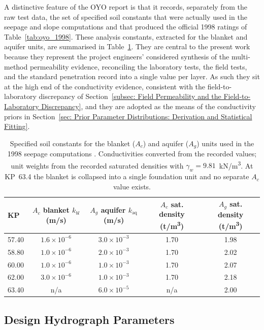 A distinctive feature of the OYO report is that it records, separately from the raw test data, the set of specified soil constants that were actually used in the seepage and slope computations and that produced the official 1998 ratings of Table~\ref{tab:oyo_1998}. These analysis constants, extracted for the blanket and aquifer units, are summarised in Table~\ref{tab:form5}. They are central to the present work because they represent the project engineers' considered synthesis of the multi-method permeability evidence, reconciling the laboratory tests, the field tests, and the standard penetration record into a single value per layer. As such they sit at the high end of the conductivity evidence, consistent with the field-to-laboratory discrepancy of Section~\ref{subsec: Field Permeability and the Field-to-Laboratory Discrepancy}, and they are adopted as the means of the conductivity priors in Section~\ref{sec: Prior Parameter Distributions: Derivation and Statistical Fitting}.

\begin{table}[htbp]
\centering
\footnotesize
\caption{Specified soil constants for the blanket ($A_c$) and aquifer ($A_g$) units used in the 1998 seepage computations \parencite{oyo_1999}. Conductivities converted from the recorded values; unit weights from the recorded saturated densities with $\gamma_w = 9.81$~kN/m\textsuperscript{3}. At KP~63.4 the blanket is collapsed into a single foundation unit and no separate $A_c$ value exists.}
\label{tab:form5}
\begin{tabular}{lcccc}
\toprule
KP & $A_c$ blanket $k_{bl}$ (m/s) & $A_g$ aquifer $k_\mathrm{aq}$ (m/s) & $A_c$ sat. density (t/m\textsuperscript{3}) & $A_g$ sat. density (t/m\textsuperscript{3}) \\
\midrule
57.40 & $1.6\times10^{-6}$ & $3.0\times10^{-3}$ & 1.70 & 1.98 \\
58.80 & $1.0\times10^{-6}$ & $2.0\times10^{-3}$ & 1.70 & 2.02 \\
60.00 & $1.0\times10^{-6}$ & $1.0\times10^{-3}$ & 1.70 & 2.07 \\
62.00 & $3.0\times10^{-6}$ & $1.0\times10^{-3}$ & 1.70 & 2.18 \\
63.40 & n/a                & $6.0\times10^{-5}$ & n/a  & 2.00 \\
\bottomrule
\end{tabular}
\end{table}

\subsection{Design Hydrograph Parameters}
\label{subsec: Geotechnical Dataset Design Hydrograph}

